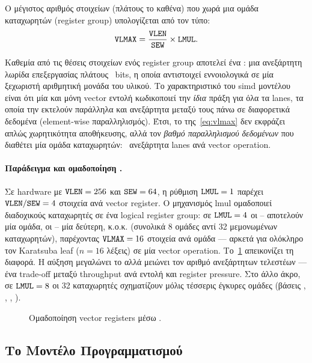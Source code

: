 Ο μέγιστος αριθμός στοιχείων (πλάτους \SEW το καθένα) που χωρά μια ομάδα
καταχωρητών (register group) υπολογίζεται από τον τύπο:
\begin{equation}
  \texttt{VLMAX} = \frac{\texttt{VLEN}}{\texttt{SEW}} \times \texttt{LMUL}.
  \label{eq:vlmax}
\end{equation}

Καθεμία από τις θέσεις στοιχείων ενός register group αποτελεί ένα
: μια ανεξάρτητη λωρίδα επεξεργασίας πλάτους \SEW~bits, η
οποία αντιστοιχεί εννοιολογικά σε μία ξεχωριστή αριθμητική μονάδα του
υλικού. Το χαρακτηριστικό του \gls{simd} μοντέλου είναι ότι μία και μόνη
vector εντολή κωδικοποιεί την \emph{ίδια} πράξη για όλα τα lanes, τα οποία
την εκτελούν παράλληλα και ανεξάρτητα μεταξύ τους πάνω σε διαφορετικά
δεδομένα (element-wise παραλληλισμός). Έτσι, το \VLMAX της~\eqref{eq:vlmax}
δεν εκφράζει απλώς χωρητικότητα αποθήκευσης, αλλά τον \emph{βαθμό
παραλληλισμού δεδομένων} που διαθέτει μία ομάδα
καταχωρητών: \VLMAX\ ανεξάρτητα lanes ανά vector operation.

\paragraph{Παράδειγμα και ομαδοποίηση \LMUL.}
Σε hardware με $\texttt{VLEN} = 256$ και $\texttt{SEW} = 64$, η ρύθμιση $\texttt{LMUL} = 1$ παρέχει
$\texttt{VLEN} / \texttt{SEW} = 4$ στοιχεία ανά vector register. Ο μηχανισμός \gls{lmul}
ομαδοποιεί διαδοχικούς καταχωρητές σε ένα logical register group: σε
$\texttt{LMUL} = 4$ οι -- αποτελούν μία ομάδα, οι --
μία δεύτερη, κ.ο.κ. (συνολικά \num{8} ομάδες αντί \num{32} μεμονωμένων
καταχωρητών), παρέχοντας $\texttt{VLMAX} = 16$ στοιχεία ανά ομάδα --- αρκετά για
ολόκληρο τον Karatsuba leaf ($n = 16$ λέξεις) σε μία vector operation.
Το~\cref{fig:lmul-grouping} απεικονίζει τη διαφορά. Η αύξηση \LMUL μεγαλώνει
το \VLMAX αλλά μειώνει τον αριθμό ανεξάρτητων τελεστέων --- ένα trade-off
μεταξύ throughput ανά εντολή και register pressure. Στο άλλο άκρο, σε
$\texttt{LMUL} = 8$ οι \num{32} καταχωρητές σχηματίζουν μόλις τέσσερις έγκυρες ομάδες
(βάσεις , , , ).

\begin{figure}[htbp]
  \centering
  
  \caption{Ομαδοποίηση vector registers μέσω \LMUL.}
  \label{fig:lmul-grouping}
\end{figure}

\subsection{Το Μοντέλο Προγραμματισμού}
\label{ssec:strip-mining}
\label{ssec:rvv-policies-instructions}

